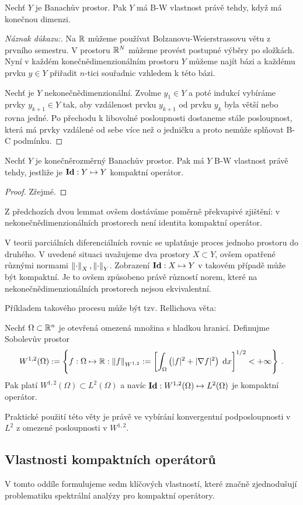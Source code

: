 \begin{lemma}
Nechť $Y$ je Banachův prostor. Pak $Y$ má B-W vlastnost právě tehdy, když má konečnou dimenzi.
\end{lemma}
\begin{proof}[Náznak důkazu:]
\uv{$\Leftarrow$} Na $\mathbb{R}$ můžeme používat Bolzanovu-Weierstrassovu větu z prvního semestru. V prostoru $\mathbb{R}^N$ můžeme provést postupné výběry po složkách. Nyní v každém konečnědimenzionálním prostoru $Y$ můžeme najít bázi a každému prvku $y \in Y$ přiřadit $n$-tici souřadnic vzhledem k této bázi. 

\uv{$\Rightarrow$} Nechť je $Y$ nekonečnědimenzionální. Zvolme $y_1 \in Y$ a poté indukcí vybíráme prvky $y_{k+1} \in Y$ tak, aby vzdálenost prvku $y_{k+1}$ od prvku $y_k$ byla větší nebo rovna jedné. Po přechodu k libovolné posloupnosti dostaneme stále posloupnost, která má prvky vzdálené od sebe více než o jedničku a proto nemůže splňovat B-C podmínku.
\end{proof}

\begin{lemma}
Nechť $Y$ je konečněrozměrný Banachův prostor. Pak má $Y$ B-W vlastnost právě tehdy, jestliže je $\mathbf{Id} : Y \mapsto Y$ kompaktní operátor.
\end{lemma}
\begin{proof}
Zřejmé.
\end{proof}

Z předchozích dvou lemmat ovšem dostáváme poměrně překvapivé zjištění: v nekonečnědimenzionálních prostorech není identita kompaktní operátor.

\begin{remark}
V teorii parciálních diferenciálních rovnic se uplatňuje proces  jednoho prostoru do druhého. V uvedené situaci uvažujeme dva prostory $ X \subset Y$, ovšem opatřené různými normami $\left\lVert\cdot\right\rVert_X, \left\lVert\cdot\right\rVert_Y$. Zobrazení $\mathbf{Id} : X \mapsto Y$ v takovém případě může být kompaktní. Je to ovšem způsobeno právě růzností norem, které na nekonečnědimenzionálních prostorech nejsou ekvivalentní.

Příkladem takového procesu může být tzv. Rellichova věta:

Nechť $\Omega \subset \mathbb{R}^n$ je otevřená omezená množina s hladkou hranicí. Definujme Sobolevův prostor \begin{align*}
    W^{1,2}(\Omega) := \left \lbrace f: \Omega \mapsto \mathbb{R} : \left\lVert f\right\rVert_{W^{1,2}} := \left[ \int_\Omega \left( |f|^2 + |\nabla f|^2 \right) \;\mathrm{d}x \right]^{1/2} < + \infty \right \rbrace \:.
\end{align*}
Pak platí $W^{1,2}(\Omega) \subset L^2(\Omega)$ a navíc $\mathbf{Id} : W^{1,2}(\Omega) \mapsto L^2(\Omega)$ je kompaktní operátor.

Praktické použití této věty je právě ve vybírání konvergentní podposloupnosti v $L^2$ z omezené posloupnosti v $W^{1,2}$.
\end{remark}

\subsection{Vlastnosti kompaktních operátorů}
V tomto oddíle formulujeme sedm klíčových vlastností, které značně zjednodušují problematiku spektrální analýzy pro kompaktní operátory.
